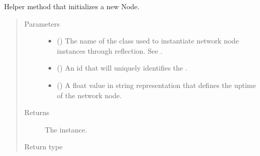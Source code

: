 \documentclass[letterpaper,10pt,english]{sphinxmanual}
\begin{document}
\begin{fulllineitems}
\begin{fulllineitems}
\end{fulllineitems}


\begin{fulllineitems}
\label{\detokenize{app.domain:app.domain.master_servers.Master._new_network_node}}
Helper method that initializes a new Node.
\begin{quote}\begin{description}
\item[{Parameters}] \leavevmode\begin{itemize}
\item {} 
 () \textendash{} The name of the class used to instantiate network node
instances through reflection. See {\hyperref[\detokenize{app.domain:module-app.domain.network_nodes}]{}}.

\item {} 
 () \textendash{} An id that will uniquely identifies the
{\hyperref[\detokenize{app.domain:app.domain.network_nodes.Node}]{}}.

\item {} 
 () \textendash{} A float value in string representation that defines the
uptime of the network node.

\end{itemize}

\item[{Returns}] \leavevmode
The {\hyperref[\detokenize{app.domain:app.domain.network_nodes.Node}]{}} instance.

\item[{Return type}] \leavevmode
{\hyperref[\detokenize{app:app.type_hints.NodeType}]{}}


\end{description}
\end{quote}
\end{fulllineitems}
\end{fulllineitems}
\end{document}
